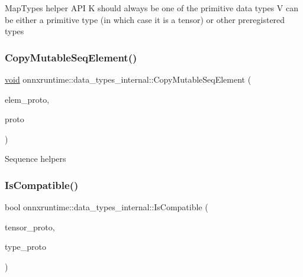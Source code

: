 Map\+Types helper A\+PI K should always be one of the primitive data types V can be either a primitive type (in which case it is a tensor) or other preregistered types \mbox{\label{namespaceonnxruntime_1_1data__types__internal_ae8a105851088c4c54974143738dfd2d5}} 
\subsubsection{\texorpdfstring{Copy\+Mutable\+Seq\+Element()}{CopyMutableSeqElement()}}
{\footnotesize\ttfamily \mbox{\hyperlink{mlasi_8h_a88f941d423cb2a819b70a1358982b1a6}{void}} onnxruntime\+::data\+\_\+types\+\_\+internal\+::\+Copy\+Mutable\+Seq\+Element (\begin{DoxyParamCaption}\item[{const O\+N\+N\+X\+\_\+\+N\+A\+M\+E\+S\+P\+A\+C\+E\+::\+Type\+Proto \&}]{elem\+\_\+proto,  }\item[{O\+N\+N\+X\+\_\+\+N\+A\+M\+E\+S\+P\+A\+C\+E\+::\+Type\+Proto \&}]{proto }\end{DoxyParamCaption})}

Sequence helpers \mbox{\label{namespaceonnxruntime_1_1data__types__internal_a9099f278b70ba024c5728c05e11897ee}} 
\subsubsection{\texorpdfstring{Is\+Compatible()}{IsCompatible()}\hspace{0.1cm}{\footnotesize\ttfamily [1/4]}}
{\footnotesize\ttfamily bool onnxruntime\+::data\+\_\+types\+\_\+internal\+::\+Is\+Compatible (\begin{DoxyParamCaption}\item[{const O\+N\+N\+X\+\_\+\+N\+A\+M\+E\+S\+P\+A\+C\+E\+::\+Type\+Proto\+\_\+\+Tensor \&}]{tensor\+\_\+proto,  }\item[{const O\+N\+N\+X\+\_\+\+N\+A\+M\+E\+S\+P\+A\+C\+E\+::\+Type\+Proto\+\_\+\+Tensor \&}]{type\+\_\+proto }\end{DoxyParamCaption})}

